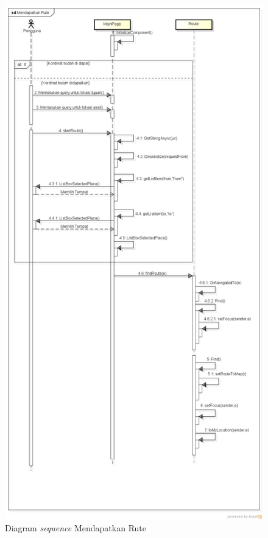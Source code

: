 \begin{figure}[h!]
	\centering
		\includegraphics[scale=0.35]{Gambar/sequence/MendapatkanRute}
	\caption{Diagram \textit{sequence} Mendapatkan Rute}
	\label{fig:sequence rute}
\end{figure}

